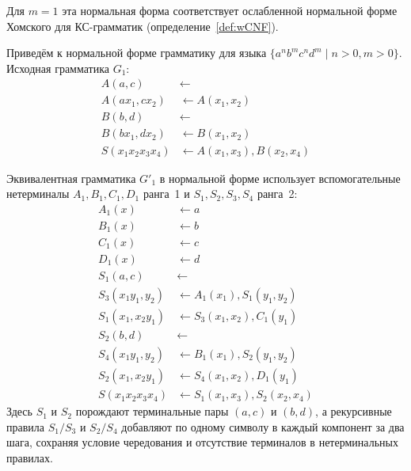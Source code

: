 Для $m = 1$ эта нормальная форма соответствует ослабленной нормальной форме Хомского для КС-грамматик (определение~\ref{def:wCNF}).

\begin{example}
    Приведём к нормальной форме грамматику для языка $\{a^n b^m c^n d^m \mid n > 0, m > 0\}$.
    Исходная грамматика $G_1$:\begin{align*}
        A(a, c)         &\leftarrow \\
        A(a x_1, c x_2) &\leftarrow A(x_1, x_2) \\
        B(b, d)         &\leftarrow \\
        B(b x_1, d x_2) &\leftarrow B(x_1, x_2) \\
        S(x_1 x_2 x_3 x_4) &\leftarrow A(x_1, x_3), B(x_2, x_4)
    \end{align*}

    Эквивалентная грамматика $G'_1$ в нормальной форме использует вспомогательные нетерминалы $A_1,B_1,C_1,D_1$ ранга~1 и
    $S_1,S_2,S_3,S_4$ ранга~2:\begin{align*}
        A_1(x)              &\leftarrow a \\
        B_1(x)              &\leftarrow b \\
        C_1(x)              &\leftarrow c \\
        D_1(x)              &\leftarrow d \\[4pt]
        S_1(a, c)           &\leftarrow \\
        S_3(x_1 y_1, y_2)   &\leftarrow A_1(x_1), S_1(y_1, y_2) \\
        S_1(x_1, x_2 y_1)   &\leftarrow S_3(x_1, x_2), C_1(y_1) \\[4pt]
        S_2(b, d)           &\leftarrow \\
        S_4(x_1 y_1, y_2)   &\leftarrow B_1(x_1), S_2(y_1, y_2) \\
        S_2(x_1, x_2 y_1)   &\leftarrow S_4(x_1, x_2), D_1(y_1) \\[4pt]
        S(x_1 x_2 x_3 x_4) &\leftarrow S_1(x_1, x_3), S_2(x_2, x_4)
    \end{align*}
    Здесь $S_1$ и $S_2$ порождают терминальные пары $(a,c)$ и $(b,d)$, а рекурсивные правила $S_1/S_3$ и $S_2/S_4$ добавляют по одному символу в каждый компонент за два шага, сохраняя условие чередования и отсутствие терминалов в нетерминальных правилах.
\end{example}
